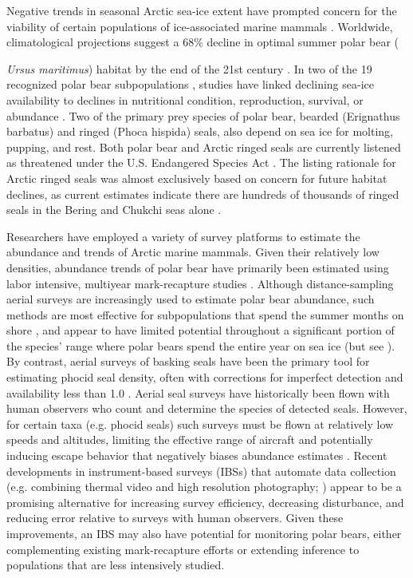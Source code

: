 \documentclass[]{rsos}%
\begin{document}
Negative trends in seasonal Arctic sea-ice extent \cite{Comiso2012} have prompted concern for the viability of certain populations of ice-associated marine mammals \cite{LaidreEtAl2015}.  Worldwide, climatological projections suggest a 68\% decline in optimal summer polar bear ({\textit{Ursus maritimus}) habitat by the end of the 21st century \cite{DurnerEtAl2009}.  In two of the 19 recognized polar bear subpopulations \cite{ObbardEtAl2010}, studies have linked declining sea-ice availability to declines in nutritional condition, reproduction, survival, or abundance \cite{RegehrEtAl2007,RegehrEtAl2010,HunterEtAl2010,RodeEtAl2010}.
Two of the primary prey species of polar bear, bearded (Erignathus barbatus) and ringed (Phoca hispida) seals, also depend on sea ice for molting, pupping, and rest.  Both polar bear and Arctic ringed seals are currently listened as threatened under the U.S. Endangered Species Act \cite{USFWS2008}.  The listing rationale for Arctic ringed seals was almost exclusively based on concern for future habitat declines, as current estimates indicate there are hundreds of thousands of ringed seals in the Bering and Chukchi seas alone \cite{Bengtson2005,ConnEtAl2014}.

Researchers have employed a variety of survey platforms to estimate the abundance and trends of Arctic marine mammals.  Given their relatively low densities, abundance trends of polar bear have primarily been estimated using labor intensive, multiyear mark-recapture studies \cite{BromaghinEtAl2015,RegehrEtAl2007,TaylorEtAl2008,PeacockEtAl2013}.  Although distance-sampling aerial surveys are increasingly used to estimate polar bear abundance, such methods are most effective for subpopulations that spend the summer months on shore \cite{StapletonEtAl2014,ObbardEtAl2015}, and appear to have limited potential throughout a significant portion of the species' range where polar bears spend the entire year on sea ice (but see \cite{AarsEtAl2009}).  By contrast, aerial surveys of basking seals have been the primary tool for estimating phocid seal density, often with corrections for imperfect detection and availability less than 1.0 \cite{Bengtson2005,VerHoefJansen2007,VerHoefEtAl2013,ConnEtAl2014}.
Aerial seal surveys have historically been flown with human observers who count and determine the species of detected seals. However, for certain taxa (e.g. phocid seals) such surveys must be flown at relatively low speeds and altitudes, limiting the effective range of aircraft and potentially inducing escape behavior that negatively biases abundance estimates \cite{BornEtAl1999}. Recent developments in instrument-based surveys (IBSs) that automate data collection (e.g. combining thermal video and high resolution photography; \cite{ChernookEtAl1999,ConnEtAl2014}) appear to be a promising alternative for increasing survey efficiency, decreasing disturbance, and reducing error relative to surveys with human observers.  Given these improvements, an IBS may also have potential for monitoring polar bears, either complementing existing mark-recapture efforts or extending inference to populations that are less intensively studied.

}
\end{document}
